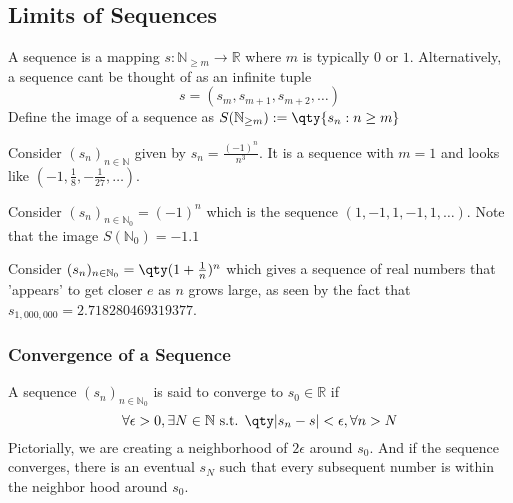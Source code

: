 \documentclass[../notes.tex]{subfiles}
\begin{document}

\subsection{Limits of Sequences}
\begin{definition}[Sequence]
	A sequence is a mapping $s : \mathbb{N}_{\geq m} \to \mathbb{R}$ where $m$ is typically $0$ or $1$. Alternatively, a sequence cant be thought of as an infinite tuple
	\[
		s = (s_m, s_{m+1}, s_{m+2}, \ldots)
	\]
	Define the image of a sequence as $S(\mathbb{N}_{\geq m}) := \qty{s_n : n \geq m}$
\end{definition}

\begin{example}
	Consider $(s_n)_{n \in \mathbb{N}}$ given by $s_n = \frac{(-1)^n}{n^3}$. It is a sequence with $m = 1$ and looks like $(-1, \frac{1}{8}, -\frac{1}{27}, \ldots)$.
\end{example}

\begin{example}
	Consider $(s_n)_{n \in \mathbb{N}_0} = (-1)^n$ which is the sequence $(1, -1, 1, -1, 1, \ldots)$. Note that the image $S(\mathbb{N}_0) = \qty{-1, 1}$
\end{example}

\begin{example}
	Consider $(s_n)_{n \in \mathbb{N}_0} = \qty(1+\frac{1}{n})^n$ which gives a sequence of real numbers that 'appears' to get closer $e$ as $n$ grows large, as seen by the fact that $s_{1,000,000} = 2.718280469319377$.
\end{example}

\subsubsection{Convergence of a Sequence}

\begin{definition}
	A sequence $(s_n)_{n\in \mathbb{N}_0}$ is said to converge to $s_0 \in \mathbb{R}$ if 
	\[
		\forall \epsilon > 0, \exists N \in \mathbb{N} \text{ s.t. } \qty|s_n - s| < \epsilon, \forall n > N
	\]
	Pictorially, we are creating a neighborhood of $2 \epsilon$ around $s_0$. And if the sequence converges, there is an eventual $s_N$ such that every subsequent number is within the neighbor hood around $s_0$.
	\begin{center}
	\end{center}
\end{definition}
\end{document}
